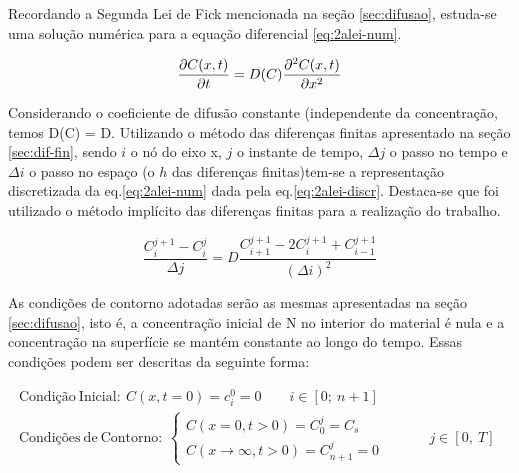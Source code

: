 Recordando a Segunda Lei de Fick mencionada na seção \ref{sec:difusao}, estuda-se uma solução numérica para a equação diferencial \ref{eq:2alei-num}.

\begin{equation}
\label{eq:2alei-num}
\pdv{C(x,t)}{t} = D(C)\pdv[2]{C(x,t)}{x}
\end{equation}

Considerando o coeficiente de difusão constante (independente da concentração, temos D(C) = D. Utilizando o método das diferenças finitas apresentado na seção \ref{sec:dif-fin}, sendo $i$ o nó do eixo x, $j$ o instante de tempo, {$\Delta j$} o passo no tempo e {$\Delta i$} o passo no espaço (o $h$ das diferenças finitas)tem-se a representação discretizada da eq.\ref{eq:2alei-num} dada pela eq.\ref{eq:2alei-discr}. Destaca-se que foi utilizado o método implícito das diferenças finitas para a realização do trabalho.

\begin{equation}
\label{eq:2alei-discr}
\dfrac{C_i^{j+1} - C_i^j}{\Delta j} = D\dfrac{C_{i+1}^{j+1} - 2C_i^{j+1} + C_{i-1}^{j+1}}{(\Delta i)^2}
\end{equation}



As condições de contorno adotadas serão as mesmas apresentadas na seção \ref{sec:difusao}, isto é, a concentração inicial de N no interior do material é nula e a concentração na superfície se mantém constante ao longo do tempo. Essas condições podem ser descritas da seguinte forma:

\begin{gather*}
		\mathrm{Condição\ Inicial: }\ C(x, t=0) = c_i^0 = 0 \qquad i \in [0;\ n+1] \\
		\mathrm{Condições\ de\ Contorno:}\ 
		\left\{
    		\begin{array}{l}
      			C(x=0, t>0) = C_0^j = C_s  \\
				C(x\rightarrow\infty, t>0) = C_{n+1}^j = 0 
			\end{array}
    		\begin{array}{l}
      		\qquad \\
			\qquad \\	   
    		\end{array}
    		\begin{array}{l}
    			j \in [0,\ T] 
    		\end{array}
		\right.	
\end{gather*}


